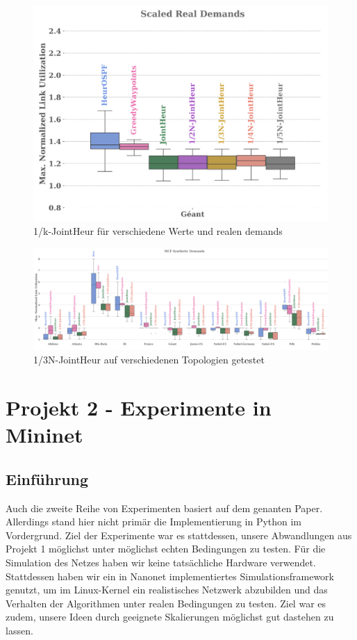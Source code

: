 \begin{figure}[h]
  \centering
  \includegraphics[width=\linewidth]{abbildungen/a32}
  \caption{1/k-JointHeur für verschiedene Werte und realen demands}
\end{figure}


\begin{figure}[h]
  \centering
  \includegraphics[width=\linewidth]{abbildungen/a33}
  \caption{1/3N-JointHeur auf verschiedenen Topologien getestet}
\end{figure}



\section{Projekt 2 - Experimente in Mininet}
\subsection{Einführung}
Auch die zweite Reihe von Experimenten basiert auf dem genanten Paper. Allerdings stand hier nicht primär die Implementierung in Python im Vordergrund. Ziel der Experimente war es stattdessen,
unsere Abwandlungen aus Projekt 1 möglichst unter möglichst echten Bedingungen zu testen. Für die Simulation des Netzes haben wir keine tatsächliche Hardware verwendet.
Stattdessen haben wir ein in Nanonet implementiertes Simulationsframework genutzt, um im Linux-Kernel ein realistisches Netzwerk abzubilden und das Verhalten der Algorithmen unter realen Bedingungen zu testen. Ziel war es zudem, unsere Ideen durch geeignete Skalierungen möglichst gut dastehen zu lassen.

